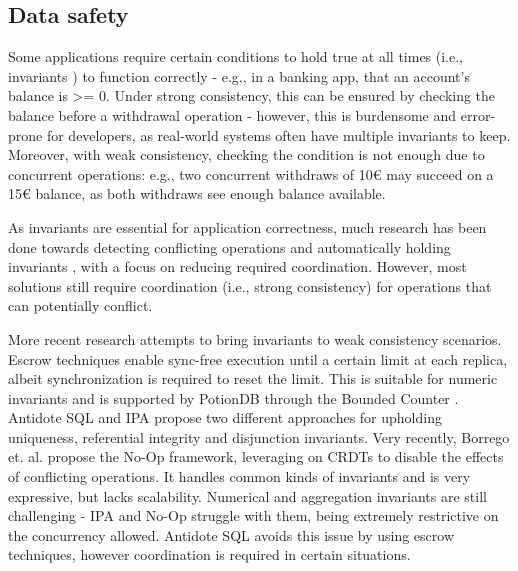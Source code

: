  \subsection{Data safety}
 \label{subsec:invariants}
 
 
Some applications require certain conditions to hold true at all times (i.e., invariants \cite{ipa, putting}) to function correctly 
 - e.g., in a banking app, that an account's balance is >= 0.
 Under strong consistency, this can be ensured by checking the balance before a withdrawal operation - however, this is burdensome and error-prone for developers, as real-world systems often have multiple invariants to keep.
 Moreover, with weak consistency, checking the condition is not enough due to concurrent operations: e.g., two concurrent withdraws of 10€ may succeed on a 15€ balance, %
 as both withdraws see enough balance available.
 
 As invariants are essential for application correctness, much research has been done towards detecting conflicting operations and automatically holding invariants \cite{putting, avoidence, pnuts, strongenough, finegrained, boundedconcurrency}, with a focus on reducing required coordination.
 However, most solutions still require coordination (i.e., strong consistency) for operations that can potentially conflict.
 
 More recent research \cite{boundedCounter, antidotesql, ipa, no-op} attempts to bring invariants to weak consistency scenarios.
 Escrow techniques \cite{boundedCounter, escrow} enable sync-free execution until a certain limit at each replica, 
 albeit synchronization is required to reset the limit.
 This is suitable for numeric invariants and is supported by PotionDB through the Bounded Counter \cite{boundedCounter}. %
 Antidote SQL and IPA \cite{antidotesql, ipa} propose two different approaches for upholding uniqueness, referential integrity and disjunction invariants.
 Very recently, Borrego et. al. \cite{no-op} propose the No-Op framework, leveraging on CRDTs to disable the effects of conflicting operations.
 It handles common kinds of invariants and is very expressive, but lacks scalability.
 Numerical and aggregation invariants are still challenging - IPA and No-Op struggle with them, being extremely restrictive on the concurrency allowed.
 Antidote SQL avoids this issue by using escrow techniques, however coordination is required in certain situations.
 
